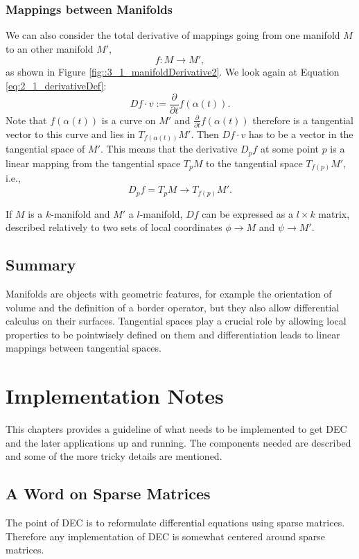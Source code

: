 \subsubsection*{Mappings between Manifolds}
\label{sec:derivativeBetweenMfs}
We can also consider the total derivative of mappings going from one manifold $M$ to an other manifold $M'$,
\[f:M\to M',\]
as shown in Figure \ref{fig::3_1_manifoldDerivative2}. We look again at Equation \ref{eq:2_1_derivativeDef}:
\[Df \cdot v := \frac{\partial}{\partial t} f(\alpha(t)).\]
Note that $f(\alpha(t))$ is a curve on $M'$ and $\frac{\partial}{\partial t}f(\alpha(t))$ therefore is a tangential vector to this curve and lies in $T_{f(\alpha(t))}M'$. Then $Df\cdot v$ has to be a vector in the tangential space of $M'$. This means that the derivative $D_pf$ at some point $p$ is a linear mapping from the tangential space $T_pM$  to the tangential space $T_{f(p)} M'$, i.e., 
\[D_p f = T_p M \rightarrow T_{f(p)} M'.\] 

If $M$ is a $k$-manifold and $M'$ a $l$-manifold, $Df$ can be expressed as a $l\times k$ matrix, described relatively to two sets of local coordinates $\phi \rightarrow M$ and $\psi \rightarrow M'$.

\subsection{Summary}
Manifolds are objects with geometric features, for example the orientation of volume and the definition of a border operator, but they also allow differential calculus on their surfaces. Tangential spaces play a crucial role by allowing local properties to be pointwisely defined on them and differentiation leads to linear mappings between tangential spaces.




\newpage
\section{Implementation Notes}
This chapters provides a guideline of what needs to be implemented to get DEC and the later applications up and running. The components needed are described and some of the more tricky details are mentioned.

\subsection{A Word on Sparse Matrices}
The point of DEC is to reformulate differential equations using sparse matrices. Therefore any implementation of DEC is somewhat centered around sparse matrices.


